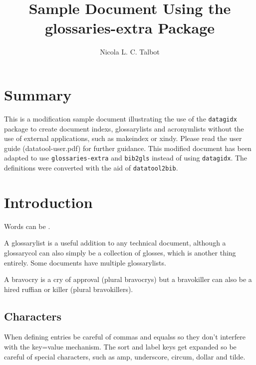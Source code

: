 \documentclass{book}
\title{Sample Document Using the glossaries-extra Package}
\author{Nicola L. C. Talbot}
\newcommand*{\appname}[1]{\texttt{#1}}
\begin{document}
\maketitle
\thispagestyle{empty}%

\frontmatter

\tableofcontents

\chapter{Summary}

This is a modification sample document illustrating the use of the
\texttt{datagidx} package to create document \glspl{index},
\glspl{glossarylist} and \glspl{acronymlist} without the use of
external  %
applications, such as \gls{makeindex} or
\gls{xindy}. Please read the user guide (datatool-user.pdf) for
further guidance. This modified document has been adapted to use
\texttt{glossaries-extra} and \appname{bib2gls} instead of using
\texttt{datagidx}. The definitions were converted with the aid of
\appname{datatool2bib}.

\mainmatter

\chapter{Introduction}

Words can be . %

A \gls{glossarylist} is a useful addition to any technical document,
although a \gls{glossarycol} can also simply be a collection of
glosses, which is another thing entirely. Some documents have
multiple \glspl{glossarylist}.

A \gls{bravocry} is a cry of approval (plural \glspl{bravocry}) but a 
\gls{bravokiller} can also be a hired ruffian or killer (plural
\glspl{bravokiller}).

\section{Characters}

When defining entries be careful of \glspl{comma} and \glspl{equals}
so they don't interfere with the key=value mechanism. The sort and
label keys get expanded so be careful of special characters, such as
\gls{amp}, \gls{underscore}, \gls{circum}, \gls{dollar} and \gls{tilde}.
\end{document}
